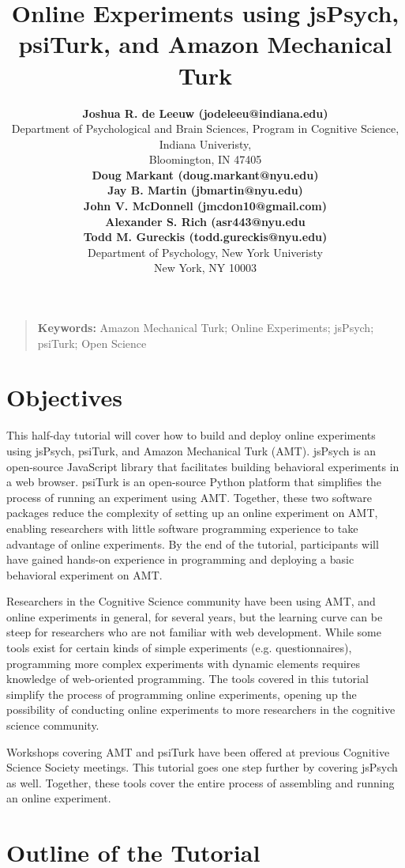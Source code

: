 \documentclass[10pt,letterpaper]{article}
\title{Online Experiments using jsPsych, psiTurk, and Amazon Mechanical Turk}
\author{{\large \bf Joshua R. de Leeuw (jodeleeu@indiana.edu)} \\
  Department of Psychological and Brain Sciences,
  Program in Cognitive Science,
  Indiana Univeristy, \\
  Bloomington, IN 47405
  \AND {\large \bf Anna Coenen (ac4066@nyu.edu)} \\
 {\large \bf Doug Markant (doug.markant@nyu.edu)}\\
  {\large \bf Jay B. Martin (jbmartin@nyu.edu)} \\
    {\large \bf John V. McDonnell (jmcdon10@gmail.com)} \\
  {\large \bf Alexander S. Rich (asr443@nyu.edu} \\
  {\large \bf Todd M. Gureckis (todd.gureckis@nyu.edu)} \\
  Department of Psychology,
  New York Univeristy \\
  New York, NY 10003}
\begin{document}
\maketitle

\begin{quote}
\small
\textbf{Keywords:} 
Amazon Mechanical Turk; Online Experiments; jsPsych; psiTurk; Open Science
\end{quote}

\section{Objectives}

This half-day tutorial will cover how to build and deploy online experiments
using jsPsych, psiTurk, and Amazon Mechanical Turk (AMT). jsPsych is an open-source JavaScript library that facilitates building behavioral experiments in a web browser. psiTurk is an open-source Python platform that simplifies the process of running an experiment using AMT. Together, these two software packages reduce the complexity of setting up an online experiment on AMT, enabling researchers with little software programming experience to take advantage of online experiments. By the end of the tutorial, participants will have gained hands-on experience in programming and deploying a basic behavioral experiment on AMT.

Researchers in the Cognitive Science community have been using AMT, and online experiments in general, for several years, but the learning curve can be steep for researchers who are not familiar with web development. While some tools exist for certain kinds of simple experiments (e.g. questionnaires), programming more complex experiments with dynamic elements requires knowledge of web-oriented programming. The tools covered in this tutorial simplify the process of programming online experiments, opening up the possibility of conducting online experiments to more researchers in the cognitive science community.

Workshops covering AMT \cite{mason2011use} and psiTurk \cite{coenen2013using} have been offered at previous Cognitive Science Society meetings. This tutorial goes one step further by covering jsPsych as well. Together, these tools cover the entire process of assembling and running an online experiment.

\section{Outline of the Tutorial}
\end{document}
